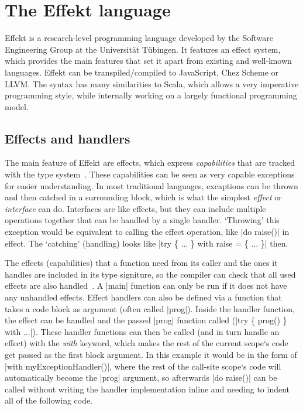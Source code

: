\chapter{The Effekt language}\label{chap:effekt}

Effekt is a research-level programming language developed by the Software Engineering Group at the Universität Tübingen. It features an effect system, which provides the main features that set it apart from existing and well-known languages. Effekt can be transpiled/compiled to JavaScript, Chez Scheme or LLVM. The syntax has many similarities to Scala, which allows a very imperative programming style, while internally working on a largely functional programming model.

\section{Effects and handlers}

The main feature of Effekt are effects, which express \textit{capabilities} that are tracked with the type system~\cite{brachthauser2020effects}. These capabilities can be seen as very capable exceptions for easier understanding. In most traditional languages, excaptions can be thrown and then catched in a surrounding block, which is what the simplest \textit{effect} or \textit{interface} can do. Interfaces are like effects, but they can include multiple operations together that can be handled by a single handler. `Throwing' this exception would be equivalent to calling the effect operation, like |do raise()| in effect. The `catching' (handling) looks like |try \{ ... \} with raise = \{ ... \}| then.

The effects (capabilities) that a function need from its caller and the ones it handles are included in its type signiture, so the compiler can check that all used effects are also handled~\cite{brachthauser2022effects}. A |main| function can only be run if it does not have any unhandled effects. Effect handlers can also be defined via a function that takes a code block as argument (often called |prog|). Inside the handler function, the effect can be handled and the passed |prog| function called (|try \{ prog() \} with ...|). These handler functions can then be called (and in turn handle an effect) with the \textit{with} keyword, which makes the rest of the current scope`s code get passed as the first block argument. In this example it would be in the form of |with myExceptionHandler()|, where the rest of the call-site scope`s code will automatically become the |prog| argument, so afterwards |do raise()| can be called without writing the handler implementation inline and needing to indent all of the following code.

